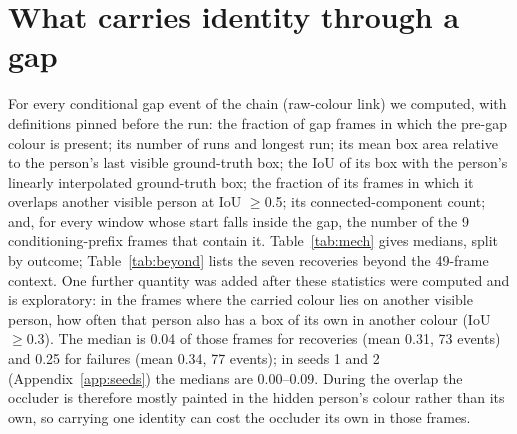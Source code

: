 \documentclass{article} %
\newcommand{\rev}[1]{#1}
\begin{document}
\rev{\section{What carries identity through a gap}
\label{app:mech}
For every conditional gap event of the chain (raw-colour link) we computed, with definitions
pinned before the run: the fraction of gap frames in which the pre-gap colour is present; its
number of runs and longest run; its mean box area relative to the person's last visible
ground-truth box; the IoU of its box with the person's linearly interpolated ground-truth
box; the fraction of its frames in which it overlaps another visible person at IoU
$\geq$0.5; its connected-component count; and, for every window whose start falls inside the
gap, the number of the 9 conditioning-prefix frames that contain it.
Table~\ref{tab:mech} gives medians, split by outcome; Table~\ref{tab:beyond} lists the seven
recoveries beyond the 49-frame context. One further quantity was added after these
statistics were computed and is exploratory: in the frames where the carried colour lies on
another visible person, how often that person also has a box of its own in another colour
(IoU $\geq$0.3). The median is 0.04 of those frames for recoveries (mean 0.31, 73 events) and
0.25 for failures (mean 0.34, 77 events); in seeds 1 and 2 (Appendix~\ref{app:seeds}) the
medians are 0.00--0.09. During the overlap the occluder is therefore mostly painted in the
hidden person's colour rather than its own, so carrying one identity can cost the occluder
its own in those frames.}
\end{document}
